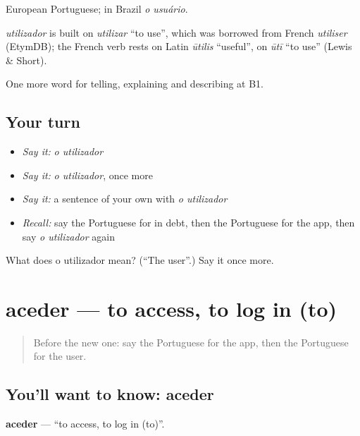 European Portuguese; in Brazil \emph{o usuário}.

\begin{cousinweb}
\emph{utilizador} is built on \emph{utilizar} \textquotedblleft{}to use\textquotedblright{}, which was borrowed from French \emph{utiliser} (EtymDB); the French verb rests on Latin \emph{ūtilis} \textquotedblleft{}useful\textquotedblright{}, on \emph{ūtī} \textquotedblleft{}to use\textquotedblright{} (Lewis \& Short).
\end{cousinweb}

\begin{grammarlens}[title={What you've built}]
One more word for telling, explaining and describing at B1.
\end{grammarlens}

\subsection*{Your turn}
\begin{itemize}
\raggedright
  \item \emph{Say it:} \emph{o utilizador}
  \item \emph{Say it:} \emph{o utilizador}, once more
  \item \emph{Say it:} a sentence of your own with \emph{o utilizador}
  \item \emph{Recall:} say the Portuguese for in debt, then the Portuguese for the app, then say \emph{o utilizador} again
\end{itemize}

\begin{tcolorbox}[breakable,colback=teal!4,colframe=teal!35!black,title={Before you move on}]
What does o utilizador mean? (\textquotedblleft{}The user\textquotedblright{}.) Say it once more.
\end{tcolorbox}
\section[aceder]{aceder — to access, to log in (to)}

\label{lesson:PT-C396-aceder}



\begin{quote}
Before the new one: say the Portuguese for the app, then the Portuguese for the user.
\end{quote}

\subsection*{You'll want to know: aceder}
\textbf{aceder} — \textquotedblleft{}to access, to log in (to)\textquotedblright{}.

